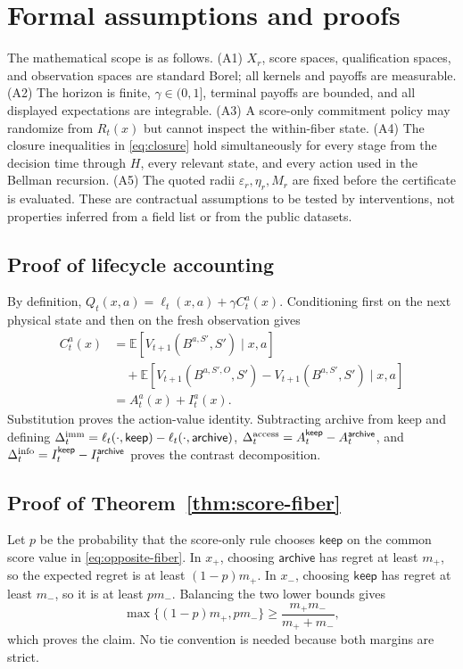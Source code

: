 \documentclass{article}
\newcommand{\keep}{\mathsf{keep}}
\newcommand{\archive}{\mathsf{archive}}
\newcommand{\E}{\mathbb{E}}
\begin{document}
\section{Formal assumptions and proofs}
\label{app:proofs}
The mathematical scope is as follows. (A1) $X_r$, score spaces, qualification spaces, and observation spaces are standard Borel; all kernels and payoffs are measurable. (A2) The horizon is finite, $\gamma\in(0,1]$, terminal payoffs are bounded, and all displayed expectations are integrable. (A3) A score-only commitment policy may randomize from $R_t(x)$ but cannot inspect the within-fiber state. (A4) The closure inequalities in \eqref{eq:closure} hold simultaneously for every stage from the decision time through $H$, every relevant state, and every action used in the Bellman recursion. (A5) The quoted radii $\varepsilon_r,\eta_r,M_r$ are fixed before the certificate is evaluated. These are contractual assumptions to be tested by interventions, not properties inferred from a field list or from the public datasets.

\subsection{Proof of lifecycle accounting}
By definition, $Q_t(x,a)=\ell_t(x,a)+\gamma C_t^a(x)$. Conditioning first on the next physical state and then on the fresh observation gives
\begin{equation}
\begin{aligned}
C_t^a(x)&=\E[V_{t+1}(B^{a,S'},S')\mid x,a]\\
&\quad+\E[V_{t+1}(B^{a,S',O},S')-V_{t+1}(B^{a,S'},S')\mid x,a]\\
&=A_t^a(x)+I_t^a(x).
\end{aligned}
\end{equation}
Substitution proves the action-value identity. Subtracting archive from keep and defining $\Delta_t^{\rm imm}=\ell_t(\cdot,\keep)-\ell_t(\cdot,\archive)$, $\Delta_t^{\rm access}=A_t^\keep-A_t^\archive$, and $\Delta_t^{\rm info}=I_t^\keep-I_t^\archive$ proves the contrast decomposition.

\subsection{Proof of Theorem~\ref{thm:score-fiber}}
Let $p$ be the probability that the score-only rule chooses $\keep$ on the common score value in \eqref{eq:opposite-fiber}. In $x_+$, choosing $\archive$ has regret at least $m_+$, so the expected regret is at least $(1-p)m_+$. In $x_-$, choosing $\keep$ has regret at least $m_-$, so it is at least $pm_-$. Balancing the two lower bounds gives
\begin{equation}
\max\{(1-p)m_+,pm_-\}\ge\frac{m_+m_-}{m_++m_-},
\end{equation}
which proves the claim. No tie convention is needed because both margins are strict.
\end{document}
